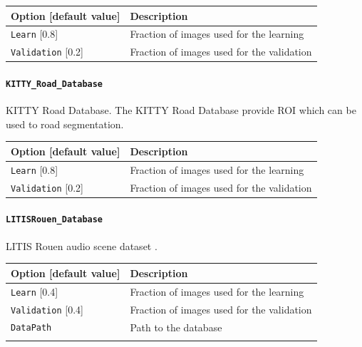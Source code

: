 \documentclass[a4paper,11pt,oneside]{article}
\begin{document}
\begin{center}
 \begin{tabular}{| p{5cm} | p{10cm} | }
 \hline
 Option [default value] & Description\\
 \hline\hline
  \cellcolor{requiredcolor}
  \lstinline!Learn! [0.8] & Fraction of images used for the learning \\
  \lstinline!Validation! [0.2] & Fraction of images used for the validation \\
 \hline
\end{tabular}
\end{center}

\paragraph{\texorpdfstring{%
\lstinline[basicstyle=\ttfamily\bfseries]!KITTY_Road_Database!}
{KITTY_Road\_Database}}
KITTY Road Database.
The KITTY Road Database provide ROI which can be used to road segmentation.

\begin{center}
 \begin{tabular}{| p{5cm} | p{10cm} | }
 \hline
 Option [default value] & Description\\
 \hline\hline
  \cellcolor{requiredcolor}
  \lstinline!Learn! [0.8] & Fraction of images used for the learning \\
  \lstinline!Validation! [0.2] & Fraction of images used for the validation \\
 \hline
\end{tabular}
\end{center}

\paragraph{\texorpdfstring{%
\lstinline[basicstyle=\ttfamily\bfseries]!LITISRouen_Database!}
{LITISRouen\_Database}}
LITIS Rouen audio scene dataset \citep{Rakotomamonjy2014}.

\begin{center}
 \begin{tabular}{| p{5cm} | p{10cm} | }
 \hline
 Option [default value] & Description\\
 \hline\hline
  \lstinline!Learn! [0.4] & Fraction of images used for the learning \\
  \lstinline!Validation! [0.4] & Fraction of images used for the validation \\
  \lstinline!DataPath! & Path to the database \\
   & \\
 \hline
\end{tabular}
\end{center}
\end{document}
